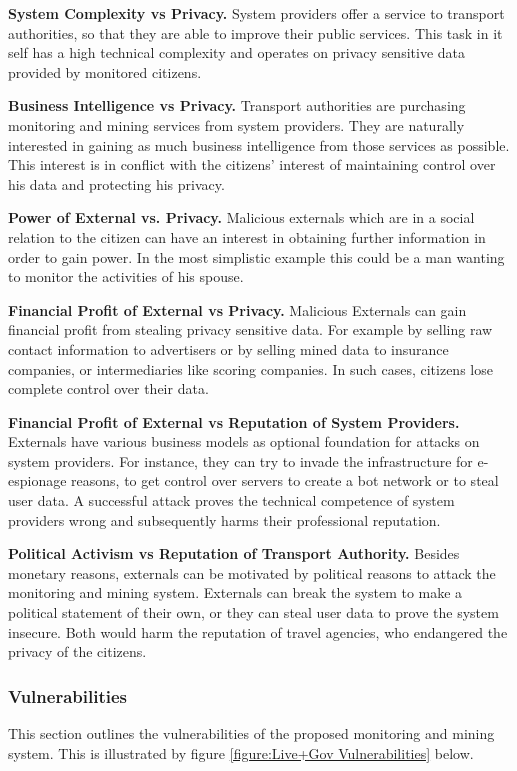 \documentclass[runningheads,a4paper]{llncs}
\begin{document}
\textbf{System Complexity vs Privacy.}
System providers offer a service to transport authorities, so that they are able to improve their public services. This task in it self has a high technical complexity and operates on privacy sensitive data provided by monitored citizens.

\textbf{Business Intelligence vs Privacy.}
Transport authorities are purchasing monitoring and mining services from system providers.
They are naturally interested in gaining as much business intelligence from those services as possible.
This interest is in conflict with the citizens' interest of maintaining control over his data and protecting his privacy.

\textbf{Power of External vs. Privacy.}
Malicious externals which are in a social relation to the citizen can have an interest in obtaining further information in order to gain power. In the most simplistic example this could be a man wanting to monitor the activities of his spouse.

\textbf{Financial Profit of External vs Privacy.}
Malicious Externals can gain financial profit from stealing privacy sensitive data.
For example by selling raw contact information to advertisers or by selling mined data to insurance companies, or intermediaries like scoring companies. In such cases, citizens lose complete control over their data.

\textbf{Financial Profit of External vs Reputation of System Providers.}
Externals have various business models as optional foundation for attacks on system providers.
For instance, they can try to invade the infrastructure for e-espionage reasons, to get control over servers to create a bot network or to steal user data. A successful attack proves the technical competence of system providers wrong and subsequently harms their professional reputation.

\textbf{Political Activism vs Reputation of Transport Authority.}
Besides monetary reasons, externals can be motivated by political reasons to attack the monitoring and mining system.
Externals can break the system to make a political statement of their own,
or they can steal user data to prove the system insecure.
Both would harm the reputation of travel agencies, who endangered the privacy of the citizens.


\subsubsection{Vulnerabilities}
\label{subsubsection:Vulnerabilities}
This section outlines the vulnerabilities of the proposed monitoring and mining system. This is illustrated by figure \ref{figure:Live+Gov Vulnerabilities} below.
\end{document}
